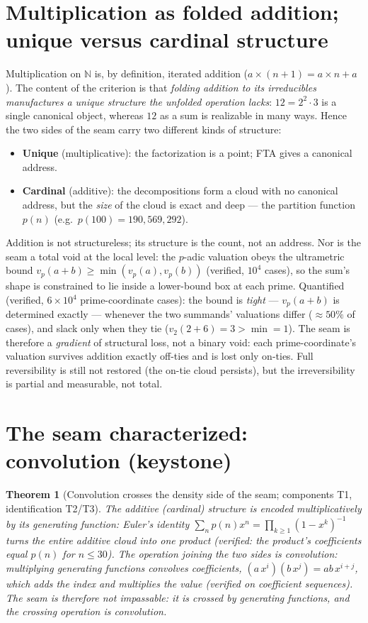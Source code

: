 \documentclass[11pt]{article}
\newtheorem{theorem}{Theorem}[section]
\begin{document}
\section{Multiplication as folded addition; unique versus cardinal structure}

Multiplication on $\mathbb{N}$ is, by definition, iterated addition ($a\times(n{+}1)=a\times n + a$). The
content of the criterion is that \emph{folding addition to its irreducibles manufactures a unique structure
the unfolded operation lacks}: $12=2^2\cdot 3$ is a single canonical object, whereas $12$ as a sum is
realizable in many ways. Hence the two sides of the seam carry two different kinds of structure:
\begin{itemize}\setlength\itemsep{1pt}
\item \textbf{Unique} (multiplicative): the factorization is a point; FTA gives a canonical address.
\item \textbf{Cardinal} (additive): the decompositions form a cloud with no canonical address, but the
\emph{size} of the cloud is exact and deep --- the partition function $p(n)$ (e.g.\ $p(100)=190{,}569{,}292$).
\end{itemize}
Addition is not structureless; its structure is the count, not an address. Nor is the seam a total void
at the local level: the $p$-adic valuation obeys the ultrametric bound $v_p(a+b)\ge\min(v_p(a),v_p(b))$
(verified, $10^4$ cases), so the sum's shape is constrained to lie inside a lower-bound box at each prime.
Quantified (verified, $6\times10^4$ prime-coordinate cases): the bound is \emph{tight} --- $v_p(a+b)$ is
determined exactly --- whenever the two summands' valuations differ ($\approx 50\%$ of cases), and slack only
when they tie ($v_2(2+6)=3>\min=1$). The seam is therefore a \emph{gradient} of structural loss, not a binary
void: each prime-coordinate's valuation survives addition exactly off-ties and is lost only on-ties. Full
reversibility is still not restored (the on-tie cloud persists), but the irreversibility is partial and
measurable, not total.

\section{The seam characterized: convolution (keystone)}

\begin{theorem}[Convolution crosses the density side of the seam; components T1, identification T2/T3]
The additive (cardinal) structure is encoded multiplicatively by its generating function: Euler's identity
$\sum_n p(n)x^n=\prod_{k\ge 1}(1-x^k)^{-1}$ turns the entire additive cloud into one product (verified: the
product's coefficients equal $p(n)$ for $n\le 30$). The operation joining the two sides is \emph{convolution}:
multiplying generating functions convolves coefficients, $(a\,x^i)(b\,x^j)=ab\,x^{i+j}$, which \emph{adds} the
index and \emph{multiplies} the value (verified on coefficient sequences). The seam is therefore not
impassable: it is crossed by generating functions, and the crossing operation is convolution.
\end{theorem}
\end{document}
